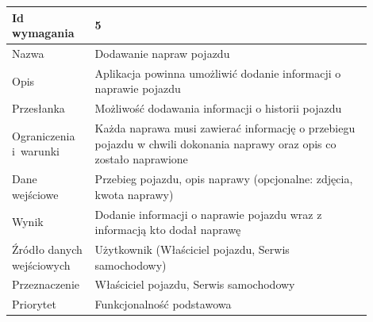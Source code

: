 \documentclass[12pt]{article}
\begin{document}
\begin{table}[H]
\begin{center}
	\begin{tabular}{|p{0.18\linewidth}|p{0.72\linewidth}|}%
	\hline
	Id wymagania 	& 5				\\ \hline
	Nazwa			& Dodawanie napraw pojazdu \\ \hline
	Opis & Aplikacja powinna umożliwić dodanie informacji o naprawie pojazdu
\\ \hline
	Przesłanka & 
Możliwość dodawania informacji o historii pojazdu
  \\ \hline
	Ograniczenia i~warunki & 
Każda naprawa musi zawierać informację o przebiegu pojazdu w chwili dokonania naprawy oraz opis co zostało naprawione
 \\ \hline
	Dane wejściowe &

Przebieg pojazdu, opis naprawy
(opcjonalne: zdjęcia, kwota naprawy)
 \\ \hline
	Wynik & Dodanie informacji o naprawie pojazdu wraz z informacją kto dodał naprawę\\ \hline
	Źródło danych wejściowych & Użytkownik (Właściciel pojazdu, Serwis samochodowy)\\ \hline
	Przeznaczenie & Właściciel pojazdu, Serwis samochodowy\\ \hline
	Priorytet & Funkcjonalność podstawowa \\ \hline
	\end{tabular}

\end{center}
\end{table}
\end{document}
